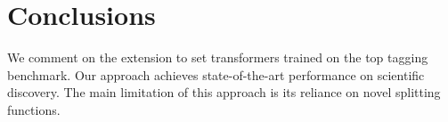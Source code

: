 \section{Conclusions}\label{sec:conclusions}

We comment on the extension to set transformers trained on the top
tagging benchmark. Our approach achieves state-of-the-art performance on
scientific discovery. The main limitation of this approach is its
reliance on novel splitting functions.

